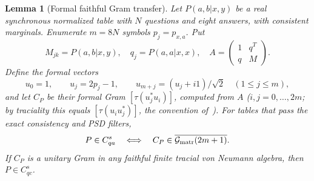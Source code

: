 \documentclass[11pt]{article}
\newtheorem{lemma}[theorem]{Lemma}
\theoremstyle{definition}
\theoremstyle{remark}
\providecommand{\G}{\mathcal G}
\begin{document}
\begin{lemma}[Formal faithful Gram transfer]\label{fd-lem:gram}
Let $P(a,b|x,y)$ be a real synchronous normalized table with $N$ questions and eight answers, with consistent marginals. Enumerate $m=8N$ symbols $p_j=p_{x,a}$. Put
\[
M_{jk}=P(a,b|x,y),\quad q_j=P(a,a|x,x),\quad
A=\begin{pmatrix}1&q^T\\q&M\end{pmatrix}.
\]
Define the formal vectors
\[
u_0=1,\qquad u_j=2p_j-1,\qquad
u_{m+j}=(u_j+i1)/\sqrt2\quad(1\le j\le m),
\]
and let $C_P$ be their formal Gram $[\tau(u_j^*u_i)]$, computed from $A$ ($i,j=0,\dots,2m$; by traciality this equals $[\tau(u_iu_j^*)]$, the convention of~\cite{Musat25}). For tables that pass the exact consistency and PSD filters,
\begin{equation}\label{fd-eq:equivalence}
P\in C_{qa}^{s}\quad\Longleftrightarrow\quad
C_P\in\overline{\G_{\rm matr}(2m+1)}.
\end{equation}
If $C_P$ is a unitary Gram in any faithful finite tracial von Neumann algebra, then $P\in C_{qc}^{s}$.
\end{lemma}
\end{document}
